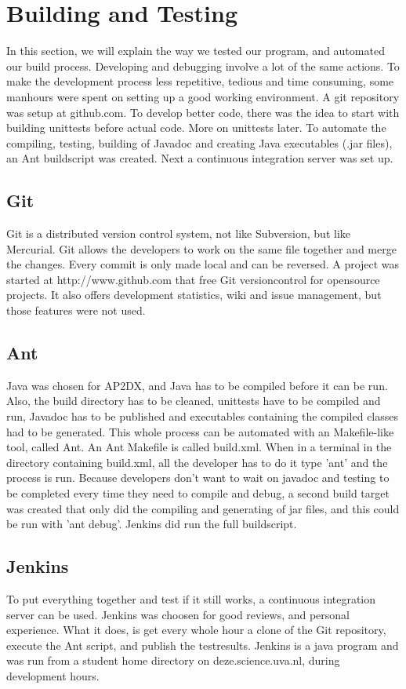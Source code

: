 \documentclass[titlepage, a4paper,10pt]{article}
\begin{document}
\newpage

\section{Building and Testing}
In this section, we will explain the way we tested our program, and automated our build process. Developing and debugging involve a lot of the same actions. To make the development process less repetitive, tedious and time consuming, some manhours were spent on setting up a good working environment. A git repository was setup at github.com. To develop better code, there was the idea to start with building unittests before actual code. More on unittests later. To automate the compiling, testing, building of Javadoc and creating Java executables (.jar files), an Ant buildscript was created. Next a continuous integration server was set up.

\subsection{Git}
Git is a distributed version control system, not like Subversion, but like Mercurial. Git allows the developers to work on the same file together and merge the changes. Every commit is only made local and can be reversed. A project was started at http://www.github.com that free Git versioncontrol for opensource projects. It also offers development statistics, wiki and issue management, but those features were not used.

\subsection{Ant}
Java was chosen for AP2DX, and Java has to be compiled before it can be run. Also, the build directory has to be cleaned, unittests have to be compiled and run, Javadoc has to be published and executables containing the compiled classes had to be generated. This whole process can be automated with an Makefile-like tool, called Ant. An Ant Makefile is called build.xml. When in a terminal in the directory containing build.xml, all the developer has to do it type 'ant' and the process is run. Because developers don't want to wait on javadoc and testing to be completed every time they need to compile and debug, a second build target was created that only did the compiling and generating of jar files, and this could be run with 'ant debug'. Jenkins did run the full buildscript.

\subsection{Jenkins}
To put everything together and test if it still works, a continuous integration server can be used. Jenkins was choosen for good reviews, and personal experience. What it does, is get every whole hour a clone of the Git repository, execute the Ant script, and publish the testresults. Jenkins is a java program and was run from a student home directory on deze.science.uva.nl, during development hours.
\end{document}
